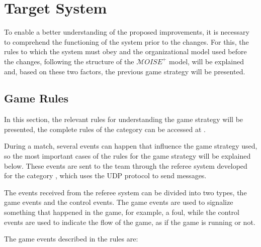 \chapter{Target System}
\label{ch:target_system}

\def \MOISEp {$\mathcal{M}OISE^+$} 

To enable a better understanding of the proposed improvements, it is necessary to comprehend the functioning of the system prior to the changes. For this, the rules to which the system must obey and the organizational model used before the changes, following the structure of the \MOISEp \cite{MOISEp} model, will be explained and, based on these two factors, the previous game strategy will be presented.

\section{Game Rules}
\label{sec:rules}

In this section, the relevant rules for understanding the game strategy will be presented, the complete rules of the category can be accessed at \cite{RulesVSSS}.

During a match, several events can happen that influence the game strategy used, so the most important cases of the rules for the game strategy will be explained below. These events are sent to the team through the referee system developed for the category \cite{VSSReferee}, which uses the UDP protocol to send messages.

The events received from the referee system can be divided into two types, the game events and the control events. The game events are used to signalize something that happened in the game, for example, a foul, while the control events are used to indicate the flow of the game, as if the game is running or not.

The game events described in the rules are:

